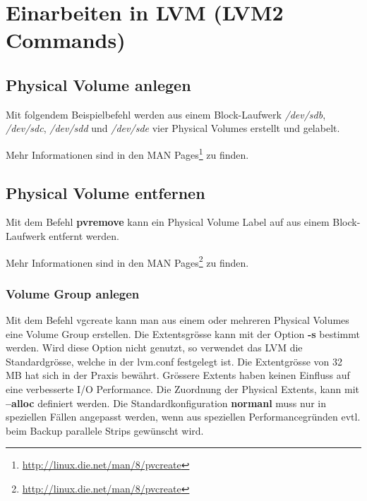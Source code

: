 \section{Einarbeiten in LVM (LVM2 Commands)}

\subsection{Physical Volume anlegen}

Mit folgendem Beispielbefehl werden aus einem Block-Laufwerk \textit{/dev/sdb}, \textit{/dev/sdc}, \textit{/dev/sdd} und \textit{/dev/sde} vier Physical Volumes erstellt und gelabelt.  



Mehr Informationen sind in den MAN Pages\footnote{\href{http://linux.die.net/man/8/pvcreate}{http://linux.die.net/man/8/pvcreate}}  zu finden.

\subsection{Physical Volume entfernen}

Mit dem Befehl  \textbf{pvremove} kann ein Physical Volume Label auf aus einem Block-Laufwerk entfernt werden.



Mehr Informationen sind in den MAN Pages\footnote{\href{http://linux.die.net/man/8/pvcreate}{http://linux.die.net/man/8/pvcreate}}  zu finden.

\subsubsection{Volume Group anlegen}

Mit dem Befehl vgcreate kann man aus einem oder mehreren Physical Volumes eine Volume Group erstellen. Die Extentsgrösse kann mit der Option \textbf{-s} bestimmt werden. Wird diese Option nicht genutzt, so verwendet das LVM die Standardgrösse, welche in der lvm.conf festgelegt ist. Die Extentgrösse von 32 MB hat sich in der Praxis bewährt.
Grössere Extents haben keinen Einfluss auf eine verbesserte I/O Performance.
Die Zuordnung der Physical Extents, kann mit \textbf{--alloc} definiert werden. Die Standardkonfiguration \textbf{normanl} muss nur in speziellen Fällen angepasst werden, wenn aus speziellen Performancegründen evtl. beim Backup parallele Strips gewünscht wird.


